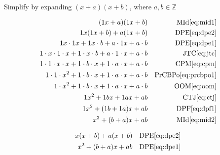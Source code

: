 \documentclass[20150903-160354-rs2.2-MarksMathNotebook.tex]{subfiles}
\begin{document}
\begin{example}[id:20141109-133316] \label{20141109-133316}  \hfill \\

Simplify by expanding $(x+a)(x+b)$, where $ a, b \in \mathbb{Z}$

\soln

\solnsteps
\begin{align*}
(1x+a)(1x+b)  && \text{MId} \eqref{eq:mid1} \\
1x(1x+b) + a(1x+b)  && \text{DPE} \eqref{eq:dpe2} \\
1x \cdot 1x + 1x \cdot b + a \cdot 1x + a \cdot b  && \text{DPE} \eqref{eq:dpe1} \\
1 \cdot x \cdot 1 \cdot x + 1 \cdot x \cdot b + a \cdot 1 \cdot x + a \cdot b  && \text{JTC} \eqref{eq:jtc} \\
1 \cdot 1 \cdot x \cdot x + 1 \cdot b \cdot x + 1 \cdot a \cdot x + a \cdot b  && \text{CPM} \eqref{eq:cpm} \\
1 \cdot 1 \cdot x^2 + 1 \cdot b \cdot x + 1 \cdot a \cdot x + a \cdot b  && \text{PrCBPo} \eqref{eq:prcbpo1} \\
1 \cdot x^2 + 1 \cdot b \cdot x + 1 \cdot a \cdot x + a \cdot b  && \text{OOM} \eqref{eq:oom} \\
1 x^2 + 1 b x + 1 a x + a b  && \text{CTJ} \eqref{eq:ctj} \\
1 x^2 + (1b + 1a)x + ab && \text{DPF} \eqref{eq:dpf1} \\
x^2+(b+a)x+ab  && \text{MId} \eqref{eq:mid2}
\end{align*}

\soln

\lesssteps
\begin{align*}
x(x+b)+a(x+b) && \text{DPE} \eqref{eq:dpe2} \\
x^2 + (b+a)x + ab && \text{DPE} \eqref{eq:dpe1}
\end{align*}

\end{example}
\end{document}
